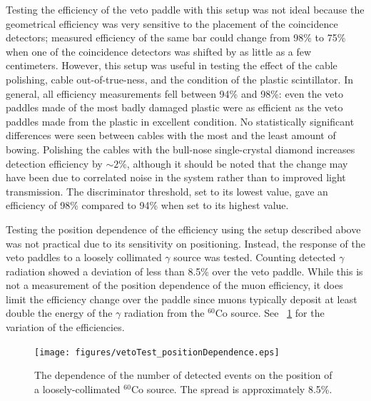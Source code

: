 Testing the efficiency of the veto paddle with this setup was not ideal because the geometrical efficiency was very sensitive to the placement of the coincidence detectors; measured efficiency of the same bar could change from 98\% to 75\% when one of the coincidence detectors was shifted by as little as a few centimeters.  However, this setup was useful in testing the effect of the cable polishing, cable out-of-true-ness, and the condition of the plastic scintillator.  In general, all efficiency measurements fell between 94\% and 98\%: even the veto paddles made of the most badly damaged plastic were as efficient as the veto paddles made from the plastic in excellent condition.  No statistically significant differences were seen between cables with the most and the least amount of bowing.  Polishing the cables with the bull-nose single-crystal diamond increases detection efficiency by $\sim2$\%, although it should be noted that the change may have been due to correlated noise in the system rather than to improved light transmission.  The discriminator threshold, set to its lowest value, gave an efficiency of 98\% compared to 94\% when set to its highest value.

Testing the position dependence of the efficiency using the setup described above was not practical due to its sensitivity on positioning.  Instead, the response of the veto paddles to a loosely collimated $\gamma$ source was tested.  Counting detected $\gamma$ radiation showed a deviation of less than 8.5\% over the veto paddle.  While this is not a measurement of the position dependence of the muon efficiency, it does limit the efficiency change over the paddle since muons typically deposit at least double the energy of the $\gamma$ radiation from the $^{60}$Co source.  See {\fig}~\ref{fig:positionDependence} for the variation of the efficiencies.
\begin{figure}[htp]
\centering
\texttt{[image: figures/vetoTest\_positionDependence.eps]}
\caption{The dependence of the number of detected events on the position of a loosely-collimated $^{60}$Co source.  The spread is approximately 8.5\%.}
\label{fig:positionDependence}
\end{figure}


